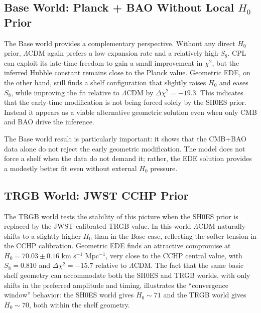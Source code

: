 \documentclass[a4paper,11pt]{article}
\begin{document}

\subsection{Base World: Planck + BAO Without Local $H_0$ Prior}
\label{sec:base_results}

The Base world provides a complementary perspective. Without any direct $H_0$ prior, $\Lambda$CDM again prefers a low expansion rate and a relatively high $S_8$. CPL can exploit its late-time freedom to gain a small improvement in $\chi^2$, but the inferred Hubble constant remains close to the Planck value. Geometric EDE, on the other hand, still finds a shelf configuration that slightly raises $H_0$ and eases $S_8$, while improving the fit relative to $\Lambda$CDM by $\Delta\chi^2 = -19.3$. This indicates that the early-time modification is not being forced solely by the SH0ES prior. Instead it appears as a viable alternative geometric solution even when only CMB and BAO drive the inference.

The Base world result is particularly important: it shows that the CMB+BAO data alone do not reject the early geometric modification. The model does not force a shelf when the data do not demand it; rather, the EDE solution provides a modestly better fit even without external $H_0$ pressure.


\subsection{TRGB World: JWST CCHP Prior}
\label{sec:trgb_results}

The TRGB world tests the stability of this picture when the SH0ES prior is replaced by the JWST-calibrated TRGB value. In this world $\Lambda$CDM naturally shifts to a slightly higher $H_0$ than in the Base case, reflecting the softer tension in the CCHP calibration. Geometric EDE finds an attractive compromise at $H_0 = 70.03 \pm 0.16$ km s$^{-1}$ Mpc$^{-1}$, very close to the CCHP central value, with $S_8 = 0.810$ and $\Delta\chi^2 = -15.7$ relative to $\Lambda$CDM. The fact that the same basic shelf geometry can accommodate both the SH0ES and TRGB worlds, with only shifts in the preferred amplitude and timing, illustrates the ``convergence window'' behavior: the SH0ES world gives $H_0 \sim 71$ and the TRGB world gives $H_0 \sim 70$, both within the shelf geometry.
\end{document}
